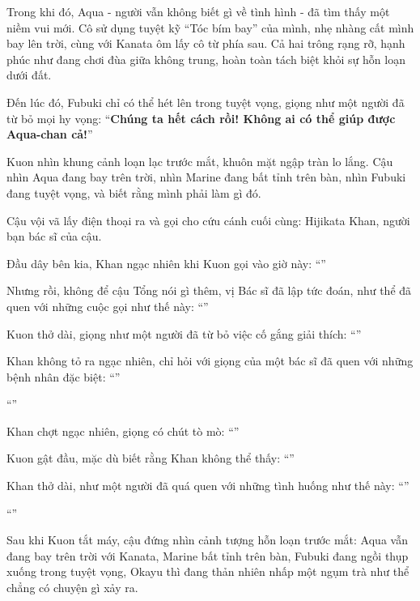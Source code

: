 \documentclass[../main.tex]{subfiles}
\begin{document}
Trong khi đó, Aqua - người vẫn không biết gì về tình hình - đã tìm thấy một niềm vui mới. Cô sử dụng tuyệt kỹ ``Tóc bím bay'' của mình, nhẹ nhàng cất mình bay lên trời, cùng với Kanata ôm lấy cô từ phía sau. Cả hai trông rạng rỡ, hạnh phúc như đang chơi đùa giữa không trung, hoàn toàn tách biệt khỏi sự hỗn loạn dưới đất.


Đến lúc đó, Fubuki chỉ có thể hét lên trong tuyệt vọng, giọng như một người đã từ bỏ mọi hy vọng: ``\textbf{Chúng ta hết cách rồi! Không ai có thể giúp được Aqua-chan cả!}''

Kuon nhìn khung cảnh loạn lạc trước mắt, khuôn mặt ngập tràn lo lắng. Cậu nhìn Aqua đang bay trên trời, nhìn Marine đang bất tỉnh trên bàn, nhìn Fubuki đang tuyệt vọng, và biết rằng mình phải làm gì đó.

Cậu vội vã lấy điện thoại ra và gọi cho cứu cánh cuối cùng: Hijikata Khan, người bạn bác sĩ của cậu.

Đầu dây bên kia, Khan ngạc nhiên khi Kuon gọi vào giờ này: ``''

Nhưng rồi, không để cậu Tổng nói gì thêm, vị Bác sĩ đã lập tức đoán, như thể đã quen với những cuộc gọi như thế này: ``''

Kuon thở dài, giọng như một người đã từ bỏ việc cố gắng giải thích: ``''

Khan không tỏ ra ngạc nhiên, chỉ hỏi với giọng của một bác sĩ đã quen với những bệnh nhân đặc biệt: ``''

``''

Khan chợt ngạc nhiên, giọng có chút tò mò: ``''

Kuon gật đầu, mặc dù biết rằng Khan không thể thấy: ``''

Khan thở dài, như một người đã quá quen với những tình huống như thế này: ``''

``''

Sau khi Kuon tắt máy, cậu đứng nhìn cảnh tượng hỗn loạn trước mắt: Aqua vẫn đang bay trên trời với Kanata, Marine bất tỉnh trên bàn, Fubuki đang ngồi thụp xuống trong tuyệt vọng, Okayu thì đang thản nhiên nhấp một ngụm trà như thể chẳng có chuyện gì xảy ra.
\end{document}
